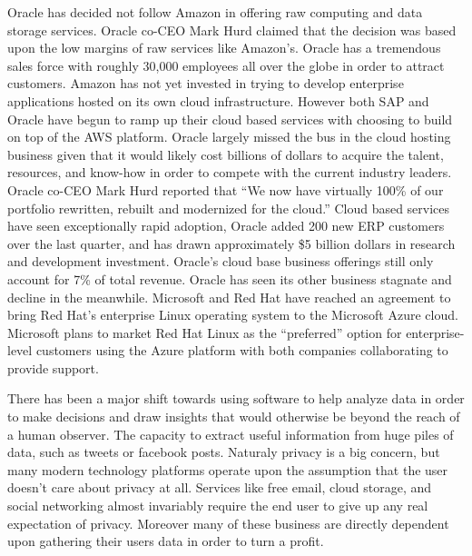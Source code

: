 Oracle has decided not follow Amazon in offering raw computing and data storage services. Oracle co-CEO Mark Hurd claimed that the decision was based upon the low margins of raw services like Amazon's.\autocite[]{OracleCloudNotAWS}
Oracle has a tremendous sales force with roughly 30,000 employees all over the globe in order to attract customers.\autocite[]{OracleCloudNotAWS}
Amazon has not yet invested in trying to develop enterprise applications hosted on its own cloud infrastructure. However both SAP and Oracle have begun to ramp up their cloud based services with choosing to build on top of the AWS platform.\autocite[]{OracleCloudNotAWS}
Oracle largely missed the bus in the cloud hosting business given that it would likely cost billions of dollars to acquire the talent, resources, and know-how in order to compete with the current industry leaders.\autocite[]{OracleCloudNotAWS}
Oracle co-CEO Mark Hurd reported that ``We now have virtually 100\% of our portfolio rewritten, rebuilt and modernized for the cloud.''\autocite[]{OracleRebuilt}
Cloud based services have seen exceptionally rapid adoption, Oracle added 200 new ERP customers over the last quarter, and has drawn approximately \$5 billion dollars in research and development investment.\autocite[]{OracleRebuilt}
Oracle's cloud base business offerings still only account for 7\% of total revenue.\autocite[]{OracleNoGrowth}
Oracle has seen its other business stagnate and decline in the meanwhile.\autocite[]{OracleNoGrowth}
Microsoft and Red Hat have reached an agreement to bring Red Hat's enterprise Linux operating system to the Microsoft Azure cloud.\autocite[]{MSRHTDeal}
Microsoft plans to market Red Hat Linux as the ``preferred'' option for enterprise-level customers using the Azure platform with both companies collaborating to provide support.\autocite[]{MSRHTDeal}

There has been a major shift towards using software to help analyze data in order to make decisions and draw insights that would otherwise be beyond the reach of a human observer.\autocite[]{NextGenBusinessSoftware}
The capacity to extract useful information from huge piles of data, such as tweets or facebook posts.\autocite[]{NextGenBusinessSoftware}
Naturaly privacy is a big concern, but many modern technology platforms operate upon the assumption that the user doesn't care about privacy at all. Services like free email, cloud storage, and social networking almost invariably require the end user to give up any real expectation of privacy. Moreover many of these business are directly dependent upon gathering their users data in order to turn a profit.\autocite[]{NextGenBusinessSoftware}
